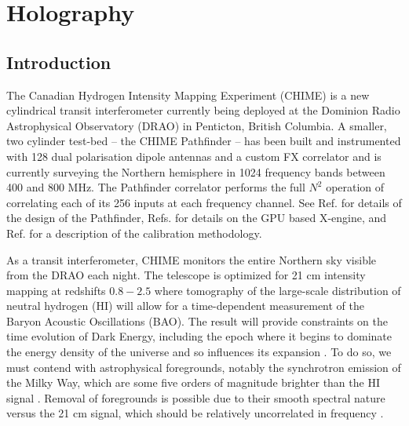\chapter{\label{chap:hol} Holography}
 



\section{Introduction} \label{ch:hol:sec:intro}

The Canadian Hydrogen Intensity Mapping Experiment (CHIME) is a new cylindrical transit interferometer currently being deployed at the Dominion Radio Astrophysical Observatory (DRAO) in Penticton, British Columbia. A smaller, two cylinder test-bed -- the CHIME Pathfinder -- has been built and instrumented with 128 dual polarisation dipole antennas and a custom FX correlator and is currently surveying the Northern hemisphere in 1024 frequency bands between 400 and 800 MHz. The Pathfinder correlator performs the full $N^2$ operation of correlating each of its 256 inputs at each frequency channel. See Ref. \citep{chimepath1} for details of the design of the Pathfinder, Refs. \citep{xeng1, xeng2, xeng3} for details on the GPU based X-engine, and Ref. \citep{chimepath2} for a description of the calibration methodology.

As a transit interferometer, CHIME monitors the entire Northern sky visible from the DRAO each night. The telescope is optimized for 21 cm intensity mapping at redshifts $0.8-2.5$ where tomography of the large-scale distribution of neutral hydrogen (HI) will allow for a time-dependent measurement of the Baryon Acoustic Oscillations (BAO). The result will provide constraints on the time evolution of Dark Energy, including the epoch where it begins to dominate the energy density of the universe and so influences its expansion \citep{furl, moraleswyithe, bao1}. To do so, we must contend with astrophysical foregrounds, notably the synchrotron emission of the Milky Way, which are some five orders of magnitude brighter than the HI signal \citep{santoscoorayknox}. Removal of foregrounds is possible due to their smooth spectral nature versus the 21 cm signal, which should be relatively uncorrelated in frequency \citep{santoscoorayknox, mmodes1, mmodes2}. 

